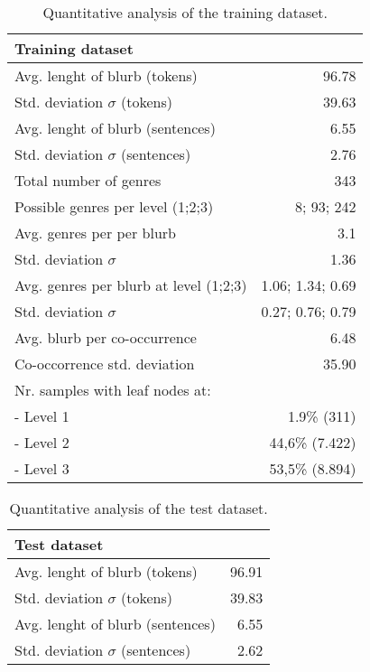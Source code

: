 \documentclass[11pt]{article}
\begin{document}
\begin{table}
\small
\begin{center}
\begin{tabular}{|l|r|}
\hline\centering\textbf{Training dataset}  &                    \\
\hline
Avg. lenght of blurb (tokens)              &  96.78             \\
Std. deviation $\sigma$ (tokens)           &  39.63             \\
Avg. lenght of blurb (sentences)           &  6.55              \\
Std. deviation $\sigma$ (sentences)        &  2.76              \\
\hline
Total number of genres                     &  343               \\
Possible genres per level (1;2;3)          &  8; 93; 242        \\
Avg. genres per per blurb                  &  3.1               \\
Std. deviation $\sigma$                    &  1.36              \\
Avg. genres per blurb at level (1;2;3)     &  1.06; 1.34; 0.69  \\
Std. deviation $\sigma$                    &  0.27; 0.76; 0.79  \\
\hline
Avg. blurb per co-occurrence               &  6.48              \\
Co-occorrence std. deviation               & 35.90              \\
\hline
Nr. samples with leaf nodes at:            &                    \\
 - Level 1                                 & 1.9\% (311)        \\
 - Level 2                                 & 44,6\% (7.422)     \\
 - Level 3                                 & 53,5\% (8.894)     \\
\hline
\end{tabular}
\end{center}
\caption{\label{quantitivy-analysis-train}Quantitative analysis of the training dataset.}
\end{table}


\begin{table}
\small
\begin{center}
\begin{tabular}{|l|r|}
\hline\centering\textbf{Test dataset}  &         \\
\hline
Avg. lenght of blurb (tokens)              &  96.91             \\
Std. deviation $\sigma$ (tokens)           &  39.83             \\
Avg. lenght of blurb (sentences)           &  6.55              \\
Std. deviation $\sigma$ (sentences)        &  2.62              \\
\hline
\end{tabular}
\end{center}
\caption{\label{quantitivy-analysis-test}Quantitative analysis of the test dataset.}
\end{table}
\end{document}
